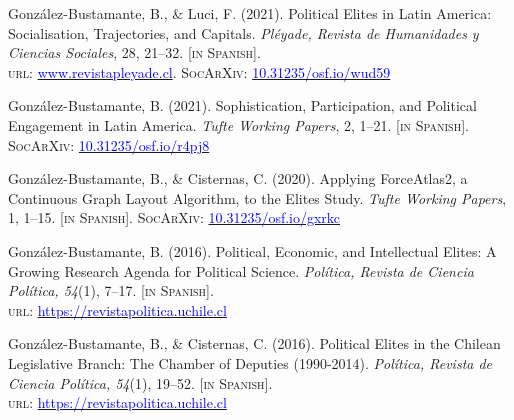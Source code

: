 \begin{publications}

\begin{benumerate}{12}

\item{\small Gonz\'alez-Bustamante, B., \& Luci, F. (2021). Political Elites in Latin America: Socialisation, Trajectories, and Capitals. {\itshape Pléyade, Revista de Humanidades y Ciencias Sociales}, 28, 21--32. {\footnotesize \scshape [in Spanish]}. \\ {\scshape url:} \href{http://www.revistapleyade.cl/index.php/OJS/article/view/359}{\textcolor{blue}{www.revistapleyade.cl}}. {\scshape \footnotesize SocArXiv}: \href{https://doi.org/10.31235/osf.io/wud59}{\textcolor{blue}{10.31235/osf.io/wud59}}}\vspace{1mm}

\item{\small Gonz\'alez-Bustamante, B. (2021). Sophistication, Participation, and Political Engagement in Latin America. {\itshape Tufte Working Papers}, 2, 1--21. {\footnotesize \scshape [in Spanish]}. {\scshape \footnotesize SocArXiv}: \href{https://doi.org/10.31235/osf.io/r4pj8}{\textcolor{blue}{10.31235/osf.io/r4pj8}}}\vspace{1mm}

\item{\small Gonz\'alez-Bustamante, B., \& Cisternas, C. (2020).  Applying ForceAtlas2, a Continuous Graph Layout Algorithm, to the Elites Study. {\itshape Tufte Working Papers}, 1, 1--15. {\footnotesize \scshape [in Spanish]}. {\scshape \footnotesize SocArXiv}: \href{https://doi.org/10.31235/osf.io/gxrkc}{\textcolor{blue}{10.31235/osf.io/gxrkc}}}\vspace{1mm}

\item{\small Gonz\'alez-Bustamante, B. (2016). Political, Economic, and Intellectual Elites: A Growing Research Agenda for Political Science. {\itshape Pol\'itica, Revista de Ciencia Pol\'itica, 54}(1), 7--17. {\footnotesize \scshape [in Spanish]}. \\ {\scshape url}: \href{https://revistapolitica.uchile.cl/index.php/RP/article/view/42690}{\textcolor{blue}{https://revistapolitica.uchile.cl}}}\vspace{1mm}

\item{\small Gonz\'alez-Bustamante, B., \& Cisternas, C. (2016). Political Elites in the Chilean Legislative Branch: The Chamber of Deputies (1990-2014). {\itshape Pol\'itica, Revista de Ciencia Pol\'itica, 54}(1), 19--52. {\footnotesize \scshape [in Spanish]}. \\ {\scshape url}: \href{https://revistapolitica.uchile.cl/index.php/RP/article/view/42691}{\textcolor{blue}{https://revistapolitica.uchile.cl}}}\vspace{1mm}


\end{benumerate}
\end{publications}
